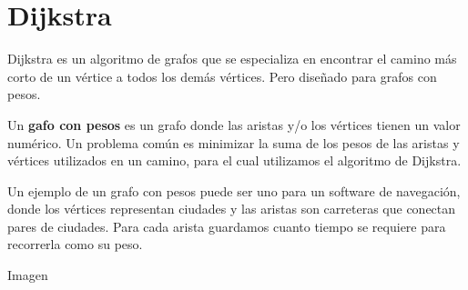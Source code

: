 \chapter{Dijkstra}
Dijkstra es un algoritmo de grafos que se especializa en encontrar el camino más corto de un vértice a todos los demás vértices. Pero diseñado para grafos con pesos.

Un \textbf{gafo con pesos} es un grafo donde las aristas y/o los vértices tienen un valor numérico. Un problema común es minimizar la suma de los pesos de las aristas y vértices utilizados en un camino, para el cual utilizamos el algoritmo de Dijkstra.

Un ejemplo de un grafo con pesos puede ser uno para un software de navegación, donde los vértices representan ciudades y las aristas son carreteras que conectan pares de ciudades. Para cada arista guardamos cuanto tiempo se requiere para recorrerla como su peso. 

\begin{center}
	Imagen
\end{center}

